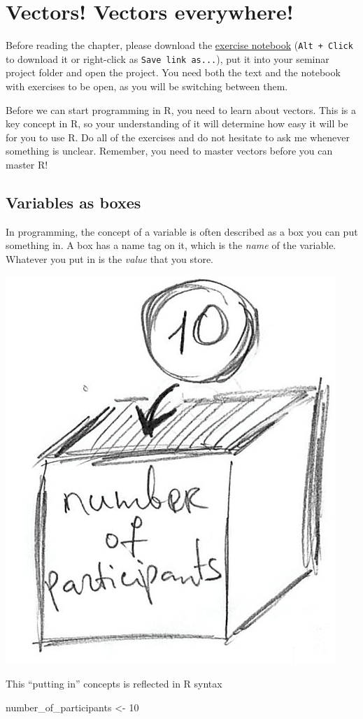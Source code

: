 \documentclass[
]{book}
\newenvironment{Shaded}{\begin{snugshade}}{\end{snugshade}}
\newcommand{\DecValTok}[1]{\textcolor[rgb]{0.00,0.00,0.81}{#1}}
\newcommand{\NormalTok}[1]{#1}
\newcommand{\OtherTok}[1]{\textcolor[rgb]{0.56,0.35,0.01}{#1}}
\begin{document}
\hypertarget{vectors}{%
\chapter{Vectors! Vectors everywhere!}\label{vectors}}

Before reading the chapter, please download the \href{notebooks/Seminar\%2002\%20-\%20Vectors.Rmd}{exercise notebook} (\texttt{Alt\ +\ Click} to download it or right-click as \texttt{Save\ link\ as...}), put it into your seminar project folder and open the project. You need both the text and the notebook with exercises to be open, as you will be switching between them.

Before we can start programming in R, you need to learn about vectors. This is a key concept in R, so your understanding of it will determine how easy it will be for you to use R. Do all of the exercises and do not hesitate to ask me whenever something is unclear. Remember, you need to master vectors before you can master R!

\hypertarget{variables}{%
\section{Variables as boxes}\label{variables}}

In programming, the concept of a variable is often described as a box you can put something in. A box has a name tag on it, which is the \emph{name} of the variable. Whatever you put in is the \emph{value} that you store.

\begin{center}\includegraphics[width=0.3\linewidth]{images/variable-as-box} \end{center}

This ``putting in'' concepts is reflected in R syntax

\begin{Shaded}
\begin{Highlighting}[]
\NormalTok{number\_of\_participants }\OtherTok{\textless{}{-}} \DecValTok{10}
\end{Highlighting}
\end{Shaded}
\end{document}
